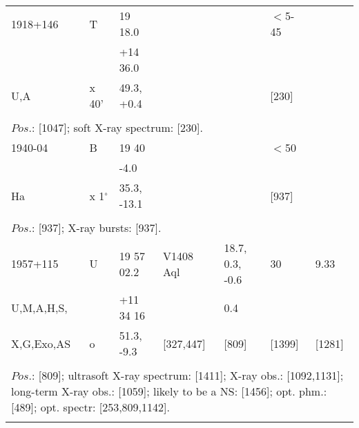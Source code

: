 \documentclass{aa}
\begin{document}
\begin{tabular}{p{2.5cm}p{1cm}p{1.8cm}p{2.3cm}p{3.3cm}p{2.0cm}p{2.2cm}}
\noalign{\smallskip}
1918+146     & T             & 19 18.0            &                    &                           & $<$5-45      &          \\
                       &                & +14 36.0          &                    &                           &                      &         \\
U,A                & x 40'       & 49.3, +0.4        &                    &                           & [230]            &         \\
\\
\multicolumn{7}{p{17.5cm}}{
$Pos$.: [1047]; soft X-ray spectrum: [230].}\\
\noalign{\smallskip}
\hline

\noalign{\smallskip}
1940-04         & B                   & 19 40                  &                      &                          & $<$50            &          \\
                        &                       & -4.0                     &                      &                          &                         &         \\
Ha                  & x 1$^\circ$   & 35.3, -13.1          &                     &                           & [937]              &         \\
\\
\multicolumn{7}{p{17.5cm}}{
$Pos$.: [937]; X-ray bursts: [937].}\\
\noalign{\smallskip}
\hline

\noalign{\smallskip}
1957+115            & U            & 19 57 02.2           & V1408 Aql          & 18.7, 0.3, -0.6        & 30                          & 9.33     \\
U,M,A,H,S,          &                & +11 34 16            &                              & 0.4                           &                               &         \\
X,G,Exo,AS        & o             & 51.3, -9.3             & [327,447]            & [809]                       & [1399]                   & [1281]   \\
\\
\multicolumn{7}{p{17.5cm}}{
$Pos$.: [809]; ultrasoft X-ray spectrum: [1411]; X-ray obs.: [1092,1131]; long-term X-ray obs.: [1059]; 
likely to be a NS: [1456]; opt. phm.: [489]; opt. spectr: [253,809,1142].}\\
\noalign{\smallskip}
\hline


\end{tabular}
\end{document}
